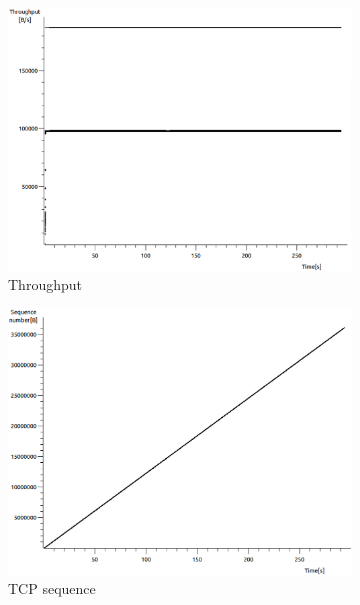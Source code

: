 \documentclass[conference,a4paper]{../../sty/IEEEtran}
\begin{document}
\begin{figure}
 \centering
 \begin{subfigure}[b]{0.2\textwidth}
  \includegraphics[width=\textwidth]{s7-0_th}
  \caption{Throughput}
 \end{subfigure}
 \begin{subfigure}[b]{0.2\textwidth}
  \includegraphics[width=\textwidth]{s7-0_seq}
  \caption{TCP sequence}
 \end{subfigure}
 \begin{subfigure}[b]{0.2\textwidth}

\end{subfigure}
\end{figure}
\end{document}
